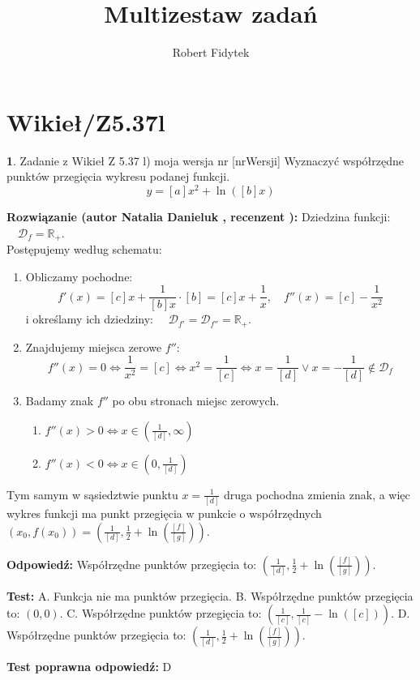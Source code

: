 \documentclass[12pt, a4paper]{article}
\title{Multizestaw zadań}
\author{Robert Fidytek}
\date{}
\theoremstyle{definition} %
\newtheorem{zad}{}
\newcommand{\kategoria}[1]{\section{#1}} %
\newcommand{\zadStart}[1]{\begin{zad}#1\newline} %
\newcommand{\zadStop}{\end{zad}}   %
\newcommand{\rozwStart}[2]{\noindent \textbf{Rozwiązanie (autor #1 , recenzent #2): }\newline} %
\newcommand{\rozwStop}{\newline}                                            %
\newcommand{\odpStart}{\noindent \textbf{Odpowiedź:}\newline}    %
\newcommand{\odpStop}{\newline}                                             %
\newcommand{\testStart}{\noindent \textbf{Test:}\newline} %
\newcommand{\testStop}{\newline} %
\newcommand{\kluczStart}{\noindent \textbf{Test poprawna odpowiedź:}\newline} %
\newcommand{\kluczStop}{\newline} %
\begin{document}
\maketitle

\kategoria{Wikieł/Z5.37l}

\zadStart{Zadanie z Wikieł Z 5.37 l) moja wersja nr [nrWersji]}
Wyznaczyć współrzędne punktów przegięcia wykresu podanej funkcji.
$$y = [a]x^2 + \ln ([b]x)$$
\zadStop

\rozwStart{Natalia Danieluk}{}
Dziedzina funkcji: $\quad \mathcal{D}_f=\mathbb{R_+}$. \\
Postępujemy według schematu:
\begin{enumerate}
\item Obliczamy pochodne: 
$$f'(x) = [c]x + \frac{1}{[b]x} \cdot [b] = [c]x + \frac{1}{x}, \quad f''(x) = [c] - \frac{1}{x^2}$$
i określamy ich dziedziny: $\quad \mathcal{D}_{f'}=\mathcal{D}_{f''}=\mathbb{R_+}$. \\
\item Znajdujemy miejsca zerowe $f''$: \\
$$f''(x)=0 \Leftrightarrow \frac{1}{x^2}=[c] \Leftrightarrow x^2=\frac{1}{[c]}\Leftrightarrow x=\frac{1}{[d]} \vee x=-\frac{1}{[d]} \notin \mathcal{D}_f$$
\item Badamy znak $f''$ po obu stronach miejsc zerowych. \\
	\begin{enumerate}
	\item $f''(x) > 0 \Leftrightarrow x \in (\frac{1}{[d]},\infty)$\\
	\item $f''(x) < 0 \Leftrightarrow x \in (0,\frac{1}{[d]})$
	\end{enumerate}
\end{enumerate}
Tym samym w sąsiedztwie punktu $x=\frac{1}{[d]}$ druga pochodna zmienia znak, a więc wykres funkcji ma punkt przegięcia w punkcie o współrzędnych $(x_0,f(x_0)) = (\frac{1}{[d]},\frac{1}{2} + \ln (\frac{[f]}{[g]}))$.
\rozwStop

\odpStart
Współrzędne punktów przegięcia to: $(\frac{1}{[d]},\frac{1}{2} + \ln (\frac{[f]}{[g]}))$.
\odpStop

\testStart
A. Funkcja nie ma punktów przegięcia.
B. Współrzędne punktów przegięcia to: $(0,0)$.
C. Współrzędne punktów przegięcia to:  $(\frac{1}{[c]},\frac{1}{[c]} - \ln ([c]))$.
D. Współrzędne punktów przegięcia to:  $(\frac{1}{[d]},\frac{1}{2} + \ln (\frac{[f]}{[g]}))$.
\testStop

\kluczStart
D
\kluczStop
\end{document}

